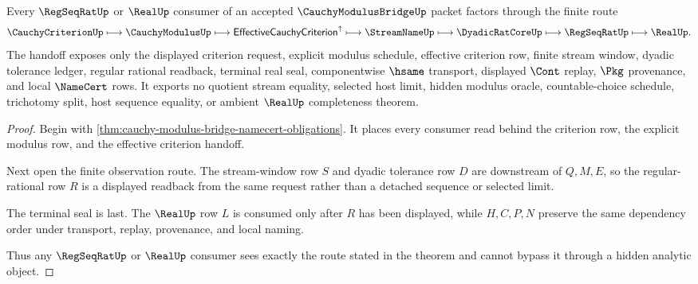 \begin{theorem}
\label{thm:cauchy-modulus-bridge-effective-criterion-handoff}
Every $\RegSeqRatUp$ or $\RealUp$ consumer of an accepted $\CauchyModulusBridgeUp$ packet factors through the finite route
$$
\CauchyCriterionUp \longmapsto \CauchyModulusUp \longmapsto \mathsf{EffectiveCauchyCriterion}^{\uparrow} \longmapsto \StreamNameUp \longmapsto \DyadicRatCoreUp \longmapsto \RegSeqRatUp \longmapsto \RealUp .
$$
The handoff exposes only the displayed criterion request, explicit modulus schedule, effective criterion row, finite stream window, dyadic tolerance ledger, regular rational readback, terminal real seal, componentwise $\hsame$ transport, displayed $\Cont$ replay, $\Pkg$ provenance, and local $\NameCert$ rows. It exports no quotient stream equality, selected host limit, hidden modulus oracle, countable-choice schedule, trichotomy split, host sequence equality, or ambient $\RealUp$ completeness theorem.
\end{theorem}
\begin{proof}
Begin with \autoref{thm:cauchy-modulus-bridge-namecert-obligations}. It places every consumer read behind the criterion row, the explicit modulus row, and the effective criterion handoff.

Next open the finite observation route. The stream-window row $S$ and dyadic tolerance row $D$ are downstream of $Q,M,E$, so the regular-rational row $R$ is a displayed readback from the same request rather than a detached sequence or selected limit.

The terminal seal is last. The $\RealUp$ row $L$ is consumed only after $R$ has been displayed, while $H,C,P,N$ preserve the same dependency order under transport, replay, provenance, and local naming.

Thus any $\RegSeqRatUp$ or $\RealUp$ consumer sees exactly the route stated in the theorem and cannot bypass it through a hidden analytic object.
\end{proof}

